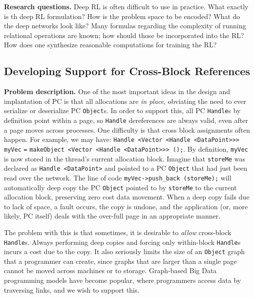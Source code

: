 \vspace{5 pt}
\noindent
\textbf{Research questions.}  
Deep RL is often difficult to use in practice.
What exactly is th deep RL formulation?  How is the problem space to be encoded?  What do the deep networks look like?
Many formulas regarding the complexity of running
relational operations are known; how should those be incorporated into the RL?  
How does one synthesize reasonable computations for training the RL?

\subsection{Developing Support for Cross-Block References}

\noindent
\textbf{Problem description.}
One of the most important ideas in the design and implantation of PC is that all allocations are \emph{in place}, obviating the
need to ever serialize or deserialize PC \texttt{Object}s.  In order to support this, all PC \texttt{Handle}s by definition
point within a page, so \texttt{Handle} dereferences are always valid, even after a page moves across processes.
One difficulty is that cross block assignments often happen.  For example, we may have:
\texttt{Handle <Vector <Handle <DataPoint>}\texttt{>}\texttt{>} 
\texttt{myVec} \texttt{=} \texttt{makeObject <Vector <Handle <DataPoint>>> ();}.
By definition, \texttt{myVec} is now
stored in the thread's current allocation block.  Imagine that \texttt{storeMe} was
declared as \texttt{Handle <DataPoint>} and pointed to a PC \texttt{Object} that had just been read over the network.  The line of code
\texttt{myVec->push\_back (storeMe);}
will automatically deep copy the PC \texttt{Object} pointed 
to by \texttt{storeMe} to the current allocation block, preserving zero cost data movement.
When a deep copy fails due to lack of space, a fault occurs, the copy is undone, and the application (or, more likely, PC itself)
deals with the over-full page in an appropriate manner.

The problem with this is that sometimes, it is desirable to \emph{allow} cross-block \texttt{Handle}s.  
Always performing deep copies and forcing only within-block \texttt{Handle}s incurs a cost due to the copy.  It also seriously
limits the
size of an \texttt{Object} graph that a programmer can create, since graphs that are larger than a single page cannot be moved
across machines or to storage.  
Graph-based Big Data programming models have become popular, where programmers access data by traversing links, and we wish to 
support this.

